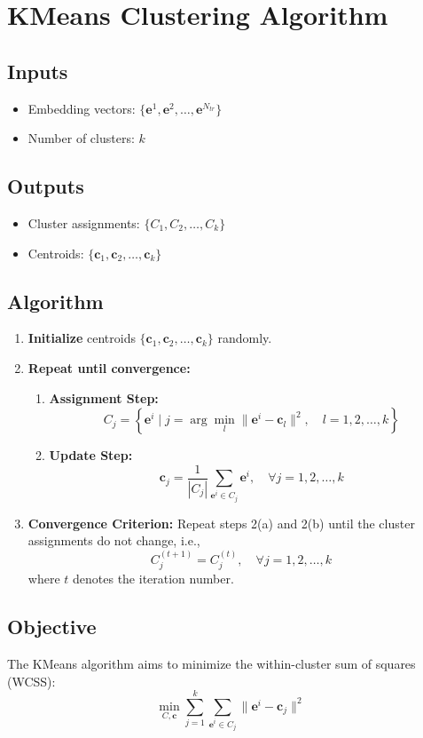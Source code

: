 \section*{KMeans Clustering Algorithm}

\subsection*{Inputs}
\begin{itemize}
    \item Embedding vectors: $\{\mathbf{e}^1, \mathbf{e}^2, \ldots, \mathbf{e}^{N_{tr}}\}$
    \item Number of clusters: $k$
\end{itemize}

\subsection*{Outputs}
\begin{itemize}
    \item Cluster assignments: $\{C_1, C_2, \ldots, C_k\}$
    \item Centroids: $\{\mathbf{c}_1, \mathbf{c}_2, \ldots, \mathbf{c}_k\}$
\end{itemize}

\subsection*{Algorithm}
\begin{enumerate}
    \item \textbf{Initialize} centroids $\{\mathbf{c}_1, \mathbf{c}_2, \ldots, \mathbf{c}_k\}$ randomly.
    \item \textbf{Repeat until convergence:}
    \begin{enumerate}
        \item \textbf{Assignment Step:}
        \[
        C_j = \left\{ \mathbf{e}^i \mid j = \arg \min_{l} \|\mathbf{e}^i - \mathbf{c}_l\|^2, \quad l = 1, 2, \ldots, k \right\}
        \]
        \item \textbf{Update Step:}
        \[
        \mathbf{c}_j = \frac{1}{|C_j|} \sum_{\mathbf{e}^i \in C_j} \mathbf{e}^i, \quad \forall j = 1, 2, \ldots, k
        \]
    \end{enumerate}
    \item \textbf{Convergence Criterion:} Repeat steps 2(a) and 2(b) until the cluster assignments do not change, i.e.,
    \[
    C_j^{(t+1)} = C_j^{(t)}, \quad \forall j = 1, 2, \ldots, k
    \]
    where $t$ denotes the iteration number.
\end{enumerate}

\subsection*{Objective}
The KMeans algorithm aims to minimize the within-cluster sum of squares (WCSS):
\[
\min_{C, \mathbf{c}} \sum_{j=1}^k \sum_{\mathbf{e}^i \in C_j} \|\mathbf{e}^i - \mathbf{c}_j\|^2
\]

